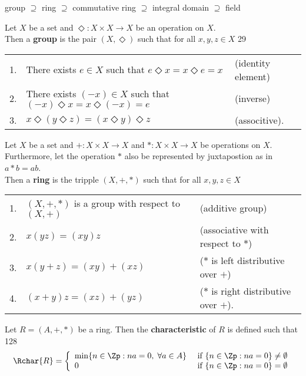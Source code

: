 group $\supseteq$ ring $\supseteq$ commutative ring $\supseteq$ integral domain $\supseteq$ field

\begin{definition}
Let $X$ be a set and $\Diamond:X\times X\to X$ be an operation on $X$. \\
Then a {\bf group} is the pair $(X,\Diamond)$
such that for all $x,y,z\in X$
\citep{durbin}{29}

\begin{tabular}{lll}
   1. & There exists $e    \in X$ such that $e    \Diamond x = x\Diamond e    = x$  & (identity element) \\
   2. & There exists $(-x) \in X$ such that $(-x) \Diamond x = x\Diamond (-x) = e$  & (inverse) \\
   3. & $x\Diamond(y\Diamond z) = (x\Diamond y)\Diamond z$                          & (associtive).
\end{tabular}
\end{definition}


\begin{definition}
Let $X$ be a set and $+:X\times X\to X$ and $*:X\times X\to X$ be operations on $X$. 
Furthermore, let the operation $*$ also be represented by juxtapostion as in $a*b=ab$.\\
Then a {\bf ring} is the tripple $(X,+,*)$
such that for all $x,y,z\in X$

\begin{tabular}{lll}
   1. & $(X,+,*)$ is a group with respect to $(X,+)$ & (additive group)                             \\
   2. & $x(yz)  = (xy)z    $                         & (associative with respect to $*$) \\
   3. & $x(y+z) = (xy)+(xz)$                         & ($*$ is left distributive over $+$)          \\
   4. & $(x+y)z = (xz)+(yz)$                         & ($*$ is right distributive over $+$).
\end{tabular}
\end{definition}

\begin{definition}
   Let $R=(A,+,*)$ be a ring.
Then the {\bf characteristic} of $R$ is defined such that
\citep{durbin}{128}
\[
   \Rchar{R}=
      \left\{
      \begin{array}{ll}
         \min\{n\in\Zp:na=0, \; \forall a\in A\} & \mbox{ if } \{n\in\Zp:na=0\}\not= \emptyset \\
         0                                       & \mbox{ if } \{n\in\Zp:na=0\}    = \emptyset
      \end{array}
      \right.
\]
\end{definition}



